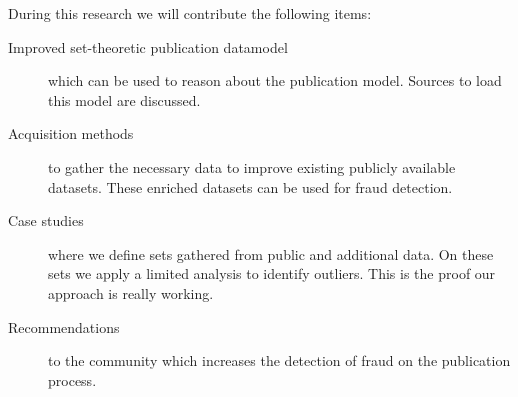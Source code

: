 \documentclass{ou-report}
\newcommand{\old}[1]{{\color{gray} #1}}
\begin{document}
During this research we will contribute the following items:
\begin{description}
    \item[Improved set-theoretic publication datamodel] which can be used to 
        reason about the publication model. Sources to load this model are 
        discussed.
    \item[Acquisition methods] to gather the necessary data to improve existing 
        publicly available datasets. These enriched datasets can be used for
        fraud detection.
    \item[Case studies] where we define sets gathered from public and additional
        data. On these sets we apply a limited analysis to identify 
        outliers. This is the proof our approach is really working.
    \item[Recommendations] to the community which increases the detection of 
        fraud on the publication process. 
\end{description}
\end{document}
